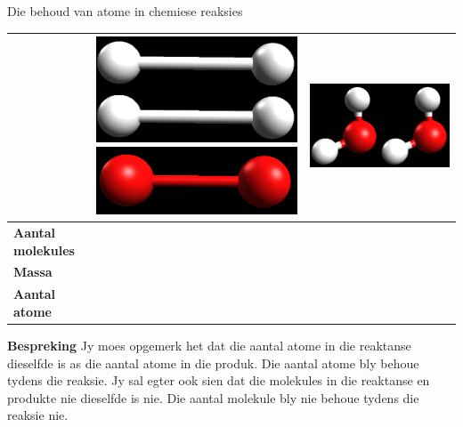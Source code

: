 \begin{activity}{Die behoud van atome in chemiese reaksies}
\begin{table}[H]
\begin{center}
\begin{tabular}{|l|l||l|}
& \includegraphics[width=.1\textwidth]{photos/hydrogen.png} \includegraphics[width=.1\textwidth]{photos/oxygen.png} & \includegraphics[width=.1\textwidth]{photos/water.png} \\ \hline
   \textbf{Aantal molekules} &  &  \\ \hline
\textbf{Massa} &  &  \\ \hline
\textbf{Aantal atome} &  &  \\ \hline
  \end{tabular}

 \end{center}

\end{table}

      \label{m38711*id65031}\noindent{}\textbf{Bespreking}
Jy moes opgemerk het dat die aantal atome in die reaktanse dieselfde is as die aantal atome in die produk. Die aantal atome bly behoue tydens die reaksie. Jy sal egter ook sien dat die molekules in die reaktanse en produkte nie dieselfde is nie. Die aantal molekule bly nie behoue tydens die reaksie nie.
 \par 
\end{activity}
\label{m38711*eip-14}

